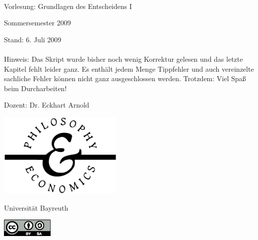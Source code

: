 \documentclass[12pt, a4paper, german]{book}
\numberwithin{equation}{section}
\begin{document}



\begin{titlepage}
\begin{center}

\ { } 

\vspace{0.5cm}

{\Large Vorlesung: Grundlagen des Entscheidens I}

\vspace{0.75cm}

Sommersemester 2009

\vspace{0.5cm}

Stand: 6. Juli 2009 \\~\\
Hinweis: Das Skript wurde bisher noch wenig Korrektur gelesen und das letzte Kapitel
fehlt leider ganz. Es enthält jedem Menge Tippfehler und auch vereinzelte sachliche Fehler
können nicht ganz ausgeschlossen werden. Trotzdem: Viel Spaß beim Durcharbeiten!

\vspace{0.5cm}

Dozent: Dr. Eckhart Arnold

\vspace{1cm}

\includegraphics[width=6cm]{Grafiken/pe_logo.eps}

\vspace{0.25cm}

{\Large Universität Bayreuth}

\vspace{1.75cm}

\includegraphics[width=2.5cm]{Grafiken/CC-BY-SA.eps}


\end{center}
\end{titlepage}
\end{document}
